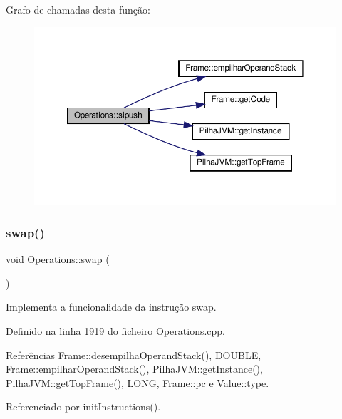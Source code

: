 Grafo de chamadas desta função\+:\nopagebreak
\begin{figure}[H]
\begin{center}
\leavevmode
\includegraphics[width=350pt]{classOperations_aed3838c73d7febfcacab9f101e6946ad_cgraph}
\end{center}
\end{figure}
\mbox{\label{classOperations_ad800d04ce11806455dd5b84a7ecd6144}} 
\subsubsection{\texorpdfstring{swap()}{swap()}}
{\footnotesize\ttfamily void Operations\+::swap (\begin{DoxyParamCaption}{ }\end{DoxyParamCaption})\hspace{0.3cm}{\ttfamily [private]}}



Implementa a funcionalidade da instrução swap. 



Definido na linha 1919 do ficheiro Operations.\+cpp.



Referências Frame\+::desempilha\+Operand\+Stack(), D\+O\+U\+B\+LE, Frame\+::empilhar\+Operand\+Stack(), Pilha\+J\+V\+M\+::get\+Instance(), Pilha\+J\+V\+M\+::get\+Top\+Frame(), L\+O\+NG, Frame\+::pc e Value\+::type.



Referenciado por init\+Instructions().

